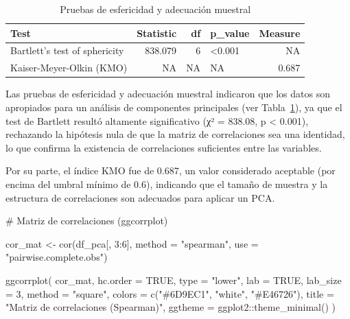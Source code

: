 \documentclass[
  spanish,
  11pt,
  a4paper,
  DIV=11,
  numbers=noendperiod]{scrartcl}
\newenvironment{Shaded}{\begin{snugshade}}{\end{snugshade}}
\newcommand{\AttributeTok}[1]{\textcolor[rgb]{0.40,0.45,0.13}{#1}}
\newcommand{\CommentTok}[1]{\textcolor[rgb]{0.37,0.37,0.37}{#1}}
\newcommand{\ConstantTok}[1]{\textcolor[rgb]{0.56,0.35,0.01}{#1}}
\newcommand{\DecValTok}[1]{\textcolor[rgb]{0.68,0.00,0.00}{#1}}
\newcommand{\FunctionTok}[1]{\textcolor[rgb]{0.28,0.35,0.67}{#1}}
\newcommand{\NormalTok}[1]{\textcolor[rgb]{0.00,0.23,0.31}{#1}}
\newcommand{\OtherTok}[1]{\textcolor[rgb]{0.00,0.23,0.31}{#1}}
\newcommand{\SpecialCharTok}[1]{\textcolor[rgb]{0.37,0.37,0.37}{#1}}
\newcommand{\StringTok}[1]{\textcolor[rgb]{0.13,0.47,0.30}{#1}}
\begin{document}
\begin{longtable}[]{@{}lrrlr@{}}

\caption{\label{tbl-pca-bartlett-kmo}Pruebas de esfericidad y adecuación
muestral}

\tabularnewline

\toprule\noalign{}
Test & Statistic & df & p\_value & Measure \\
\midrule\noalign{}
\endhead
\bottomrule\noalign{}
\endlastfoot
Bartlett's test of sphericity & 838.079 & 6 & \textless0.001 & NA \\
Kaiser-Meyer-Olkin (KMO) & NA & NA & NA & 0.687 \\

\end{longtable}

Las pruebas de esfericidad y adecuación muestral indicaron que los datos
son apropiados para un análisis de componentes principales (ver
Tabla~\ref{tbl-pca-bartlett-kmo}), ya que el test de Bartlett resultó
altamente significativo (χ² = 838.08, p \textless{} 0.001), rechazando
la hipótesis nula de que la matriz de correlaciones sea una identidad,
lo que confirma la existencia de correlaciones suficientes entre las
variables.

Por su parte, el índice KMO fue de 0.687, un valor considerado aceptable
(por encima del umbral mínimo de 0.6), indicando que el tamaño de
muestra y la estructura de correlaciones son adecuados para aplicar un
PCA.

\begin{Shaded}
\begin{Highlighting}[numbers=left,,]
\CommentTok{\# Matriz de correlaciones (ggcorrplot)}

\NormalTok{cor\_mat }\OtherTok{\textless{}{-}} \FunctionTok{cor}\NormalTok{(df\_pca[, }\DecValTok{3}\SpecialCharTok{:}\DecValTok{6}\NormalTok{], }\AttributeTok{method =} \StringTok{"spearman"}\NormalTok{, }
               \AttributeTok{use =} \StringTok{"pairwise.complete.obs"}\NormalTok{)}

\FunctionTok{ggcorrplot}\NormalTok{(}
\NormalTok{  cor\_mat, }
  \AttributeTok{hc.order =} \ConstantTok{TRUE}\NormalTok{, }
  \AttributeTok{type =} \StringTok{"lower"}\NormalTok{, }
  \AttributeTok{lab =} \ConstantTok{TRUE}\NormalTok{,}
  \AttributeTok{lab\_size =} \DecValTok{3}\NormalTok{,}
  \AttributeTok{method =} \StringTok{"square"}\NormalTok{,}
  \AttributeTok{colors =} \FunctionTok{c}\NormalTok{(}\StringTok{"\#6D9EC1"}\NormalTok{, }\StringTok{"white"}\NormalTok{, }\StringTok{"\#E46726"}\NormalTok{),}
  \AttributeTok{title =} \StringTok{"Matriz de correlaciones (Spearman)"}\NormalTok{,}
  \AttributeTok{ggtheme =}\NormalTok{ ggplot2}\SpecialCharTok{::}\FunctionTok{theme\_minimal}\NormalTok{()}
\NormalTok{)}
\end{Highlighting}
\end{Shaded}
\end{document}
